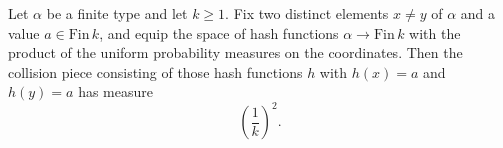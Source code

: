 \begin{lemma}
\label{CommunicationComplexity.Functions.Hash.collisionPiece_measureReal}
\leanok
{}
Let $\alpha$ be a finite type and let $k \ge 1$. Fix two distinct elements $x \ne y$ of
$\alpha$ and a value $a \in \mathrm{Fin}\,k$, and equip the space of hash functions
$\alpha \to \mathrm{Fin}\,k$ with the product of the uniform probability measures on the
coordinates. Then the collision piece consisting of those hash functions $h$ with $h(x)
= a$ and $h(y) = a$ has measure
\[
  \left(\frac{1}{k}\right)^2.
\]
\end{lemma}

